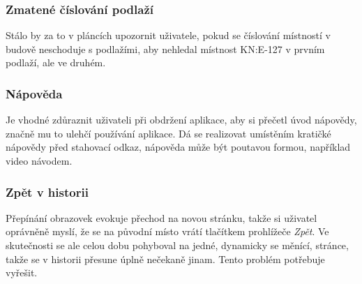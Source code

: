 \subsubsection*{Zmatené číslování podlaží}
Stálo by za to v pláncích upozornit uživatele, pokud se číslování místností v bu\-do\-vě neschoduje s podlažími, aby nehledal místnost KN:E-127 v prvním podlaží, ale ve druhém.
\subsubsection*{Nápověda}
Je vhodné zdůraznit uživateli při obdržení aplikace, aby si přečetl úvod nápovědy, značně mu to ulehčí používání aplikace. Dá se realizovat umístěním kratičké nápovědy před stahovací odkaz, nápověda může být poutavou formou, například video návodem.
\subsubsection*{Zpět v historii}
Přepínání obrazovek evokuje přechod na novou stránku, takže si uživatel oprávněně myslí, že se na původní místo vrátí tlačítkem prohlížeče \emph{Zpět}. Ve skutečnosti se ale celou dobu pohyboval na jedné, dynamicky se měnící, stránce, takže se v historii přesune úplně nečekaně jinam. Tento problém potřebuje vyřešit.






